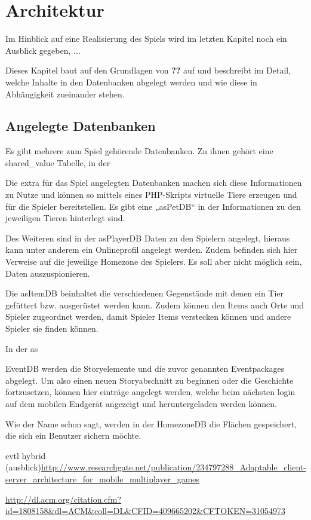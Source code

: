 \chapter{Architektur}
\label{cha:my_server}
Im Hinblick auf eine Realisierung des Spiels wird im letzten Kapitel noch ein Ausblick gegeben, ...

Dieses Kapitel baut auf den Grundlagen von \textbf{??} auf und beschreibt im Detail, welche Inhalte in den Datenbanken abgelegt werden und wie diese in Abhängigkeit zueinander stehen.


\section{Angelegte Datenbanken} 
Es gibt mehrere zum Spiel gehörende Datenbanken. 
Zu ihnen gehört eine \glqq shared\_value \grqq Tabelle, in der 



Die extra für das Spiel angelegten Datenbanken machen sich diese Informationen zu Nutze und können so mittels eines PHP-Skripts virtuelle Tiere erzeugen und für die Spieler bereitstellen.
Es gibt eine „asPetDB“ in der Informationen zu den jeweiligen Tieren hinterlegt sind.

Des Weiteren sind in der asPlayerDB Daten zu den Spielern angelegt,  hieraus kann unter anderem ein Onlineprofil angelegt werden. Zudem befinden sich hier Verweise auf die jeweilige Homezone des Spielers. Es soll aber nicht möglich sein, Daten auszuspionieren.

Die asItemDB beinhaltet die verschiedenen Gegenstände mit denen ein Tier gefüttert bzw.
ausgerüstet werden kann. Zudem können den Items auch Orte und Spieler zugeordnet werden, damit Spieler Items verstecken können und andere Spieler sie finden können.

In der as

EventDB werden die Storyelemente und die zuvor genannten Eventpackages abgelegt.
Um also einen neuen Storyabschnitt zu beginnen oder die Geschichte fortzusetzen, können hier einträge angelegt werden, welche beim nächsten login auf dem mobilen Endgerät angezeigt und heruntergeladen werden können.

Wie der Name schon sagt, werden in der HomezoneDB die Flächen gespeichert, die sich ein Benutzer sichern möchte. 


evtl hybrid (ausblick)\url{http://www.researchgate.net/publication/234797288_Adaptable_client-server_architecture_for_mobile_multiplayer_games}

\url{http://dl.acm.org/citation.cfm?id=1808158&dl=ACM&coll=DL&CFID=409665202&CFTOKEN=31054973}